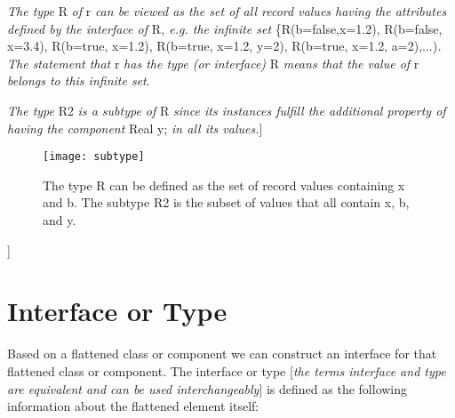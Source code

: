 \documentclass[../MLS.tex]{subfiles}
\begin{document}
\emph{The type} R \emph{of} r \emph{can be viewed as the set of all
record values having the attributes defined by the interface of}
R\emph{, e.g. the infinite set} \{R(b=false,x=1.2), R(b=false, x=3.4),
R(b=true, x=1.2), R(b=true, x=1.2, y=2), R(b=true, x=1.2,
a=2),...)\emph{. The statement that} r \emph{has the type (or
interface)} R \emph{means that the value of} r \emph{belongs to this
infinite set}.

\emph{The type} R2 \emph{is a subtype of} R \emph{since its instances
fulfill the additional property of having the component} Real y;
\emph{in all its values.}{]}

\begin{figure}[H]
\caption{The type R can be defined as the set of
record values containing x and b. The subtype R2 is the subset of values
that all contain x, b, and y.}
\texttt{[image: subtype]}
\end{figure}
{]}

\section{Interface or Type}

Based on a flattened class or component we can construct an interface
for that flattened class or component. The interface or type
{[}\emph{the terms interface and type are equivalent and can be used
interchangeably}{]} is defined as the following information about the
flattened element itself:
\end{document}
